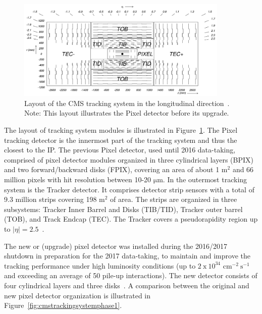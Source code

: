 \begin{figure}[ht!]
\centering
\includegraphics[width=0.9\textwidth]{Figures/Apparatus/cmstrackingsystem.png}
\caption[Layout of the CMS tracking system in the longitudinal direction]{Layout of the CMS tracking system in the longitudinal direction~\cite{CMS:2008xjf}. Note: This layout illustrates the Pixel detector before its upgrade.}
\label{fig:cmstrackingsystem}
\end{figure}
The layout of tracking system modules is illustrated in Figure~\ref{fig:cmstrackingsystem}. The Pixel tracking detector is the innermost part of the tracking system and thus the closest to the IP. The previous Pixel detector, used until 2016 data-taking, comprised of pixel detector modules organized in three cylindrical layers (BPIX) and two forward/backward disks (FPIX), covering an area of about 1 m$^{2}$ and 66 million pixels with hit resolution between 10-20 $\mathrm{\mu m}$. In the outermost tracking system is the Tracker detector. It comprises detector strip sensors with a total of 9.3 million strips covering 198 m$^{2}$ of area. The strips are organized in three subsystems: Tracker Inner Barrel and Disks (TIB/TID), Tracker outer barrel (TOB), and Track Endcap (TEC). The Tracker covers a pseudorapidity region up to $|\eta|=2.5$~\cite{CMS:2008xjf}.

The new or (upgrade) pixel detector was installed during the 2016/2017 shutdown in preparation for the 2017 data-taking, to maintain and improve the tracking performance under high luminosity conditions (up to $\mathrm{2~x~10^{34}}$ $\mathrm{cm^{-2}~s^{-1}}$ and exceeding an average of 50 pile-up interactions). The new detector consists of four cylindrical layers and three disks~\cite{cmspixelupgrade}. A comparison between the original and new pixel detector organization is illustrated in Figure~\ref{fig:cmstrackingsystemphase1}.


